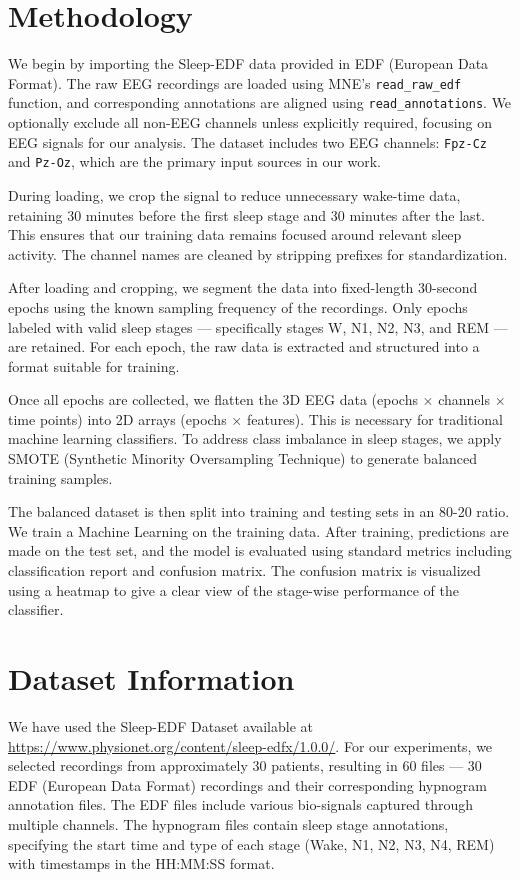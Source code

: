
\section{Methodology}

We begin by importing the Sleep-EDF data provided in EDF (European Data Format). The raw EEG recordings are loaded using MNE's \texttt{read\_raw\_edf} function, and corresponding annotations are aligned using \texttt{read\_annotations}. We optionally exclude all non-EEG channels unless explicitly required, focusing on EEG signals for our analysis. The dataset includes two EEG channels: \texttt{Fpz-Cz} and \texttt{Pz-Oz}, which are the primary input sources in our work.

During loading, we crop the signal to reduce unnecessary wake-time data, retaining 30 minutes before the first sleep stage and 30 minutes after the last. This ensures that our training data remains focused around relevant sleep activity. The channel names are cleaned by stripping prefixes for standardization.

After loading and cropping, we segment the data into fixed-length 30-second epochs using the known sampling frequency of the recordings. Only epochs labeled with valid sleep stages — specifically stages W, N1, N2, N3, and REM — are retained. For each epoch, the raw data is extracted and structured into a format suitable for training.

Once all epochs are collected, we flatten the 3D EEG data (epochs $\times$ channels $\times$ time points) into 2D arrays (epochs $\times$ features). This is necessary for traditional machine learning classifiers. To address class imbalance in sleep stages, we apply SMOTE (Synthetic Minority Oversampling Technique) to generate balanced training samples.

The balanced dataset is then split into training and testing sets in an 80-20 ratio. We train a  Machine Learning   on the training data. After training, predictions are made on the test set, and the model is evaluated using standard metrics including classification report and confusion matrix. The confusion matrix is visualized using a heatmap to give a clear view of the stage-wise performance of the classifier.


\section{Dataset Information}

We have used the Sleep-EDF Dataset available at \url{https://www.physionet.org/content/sleep-edfx/1.0.0/}. For our experiments, we selected recordings from approximately 30 patients, resulting in 60 files — 30 EDF (European Data Format) recordings and their corresponding hypnogram annotation files. The EDF files include various bio-signals captured through multiple channels. The hypnogram files contain sleep stage annotations, specifying the start time and type of each stage (Wake, N1, N2, N3, N4, REM) with timestamps in the HH:MM:SS format.

